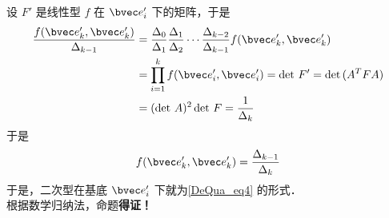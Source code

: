 \begin{enumerate}
设 $F'$ 是线性型 $f$ 在 $\bvec e'_i$ 下的矩阵，于是
\begin{equation}
\begin{aligned}
\frac{f(\bvec e'_k,\bvec e'_k)}{\Delta_{k-1}}&=\frac{\Delta_0}{\Delta_1}\frac{\Delta_1}{\Delta_2}\cdots\frac{\Delta_{k-2}}{\Delta_{k-1}}f(\bvec e'_k,\bvec e'_k)\\
&=\prod_{i=1}^k f(\bvec e'_i,\bvec e'_i)=\det\, F'=\det\, (A^TFA)\\
&=(\det{\,A})^2\det\, F=\frac{1}{\Delta_k}
\end{aligned}
\end{equation}
于是
\begin{equation}
f(\bvec e'_k,\bvec e'_k)=\frac{\Delta_{k-1}}{\Delta_k}
\end{equation}
于是，二次型在基底 $\bvec e'_i$ 下就为\autoref{DeQua_eq4} 的形式．\\
根据数学归纳法，命题\textbf{得证！}
\end{enumerate}
